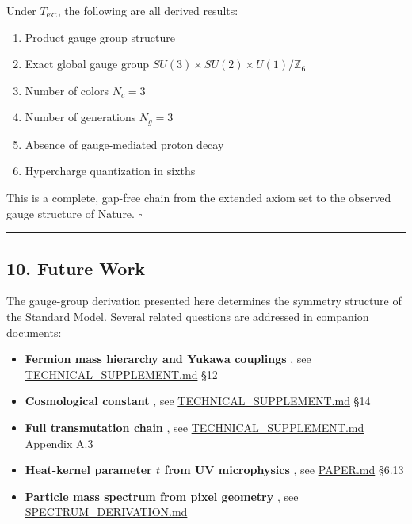 Under \(T_{\mathrm{ext}}\), the following are all derived results:

\begin{enumerate}
\def\labelenumi{\arabic{enumi}.}
\tightlist
\item
  Product gauge group structure
\item
  Exact global gauge group \(SU(3) \times SU(2) \times U(1)/\mathbb{Z}_6\)
\item
  Number of colors \(N_c = 3\)
\item
  Number of generations \(N_g = 3\)
\item
  Absence of gauge-mediated proton decay
\item
  Hypercharge quantization in sixths
\end{enumerate}

This is a complete, gap-free chain from the extended axiom set to the observed gauge structure of Nature. \(\square\)

\begin{center}\rule{0.5\linewidth}{0.5pt}\end{center}

\subsection{10. Future Work}\label{10-future-work}

The gauge-group derivation presented here determines the symmetry structure of the Standard Model. Several related questions are addressed in companion documents:

\begin{itemize}
\tightlist
\item
  \textbf{Fermion mass hierarchy and Yukawa couplings} , see \url{TECHNICAL_SUPPLEMENT.md} §12
\item
  \textbf{Cosmological constant} , see \url{TECHNICAL_SUPPLEMENT.md} §14
\item
  \textbf{Full transmutation chain} , see \url{TECHNICAL_SUPPLEMENT.md} Appendix A.3
\item
  \textbf{Heat-kernel parameter \(t\) from UV microphysics} , see \url{PAPER.md} §6.13
\item
  \textbf{Particle mass spectrum from pixel geometry} , see \url{SPECTRUM_DERIVATION.md}
\end{itemize}
